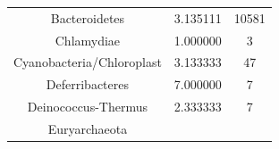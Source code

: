 \documentclass[12pt,twoside]{dukestatscithesis}
\begin{document}
\begin{longtable}[]{@{}ccc@{}}
\begin{minipage}[t]{0.35\columnwidth}
Bacteroidetes\strut
\end{minipage} & \begin{minipage}[t]{0.28\columnwidth}\centering\strut
3.135111\strut
\end{minipage} & \begin{minipage}[t]{0.28\columnwidth}\centering\strut
10581\strut
\end{minipage}\tabularnewline
\begin{minipage}[t]{0.35\columnwidth}\centering\strut
Chlamydiae\strut
\end{minipage} & \begin{minipage}[t]{0.28\columnwidth}\centering\strut
1.000000\strut
\end{minipage} & \begin{minipage}[t]{0.28\columnwidth}\centering\strut
3\strut
\end{minipage}\tabularnewline
\begin{minipage}[t]{0.35\columnwidth}\centering\strut
Cyanobacteria/Chloroplast\strut
\end{minipage} & \begin{minipage}[t]{0.28\columnwidth}\centering\strut
3.133333\strut
\end{minipage} & \begin{minipage}[t]{0.28\columnwidth}\centering\strut
47\strut
\end{minipage}\tabularnewline
\begin{minipage}[t]{0.35\columnwidth}\centering\strut
Deferribacteres\strut
\end{minipage} & \begin{minipage}[t]{0.28\columnwidth}\centering\strut
7.000000\strut
\end{minipage} & \begin{minipage}[t]{0.28\columnwidth}\centering\strut
7\strut
\end{minipage}\tabularnewline
\begin{minipage}[t]{0.35\columnwidth}\centering\strut
Deinococcus-Thermus\strut
\end{minipage} & \begin{minipage}[t]{0.28\columnwidth}\centering\strut
2.333333\strut
\end{minipage} & \begin{minipage}[t]{0.28\columnwidth}\centering\strut
7\strut
\end{minipage}\tabularnewline
\begin{minipage}[t]{0.35\columnwidth}\centering\strut
Euryarchaeota\strut
\end{minipage} & \begin{minipage}[t]{0.28\columnwidth}\centering\strut

\end{minipage}
\end{longtable}
\end{document}
